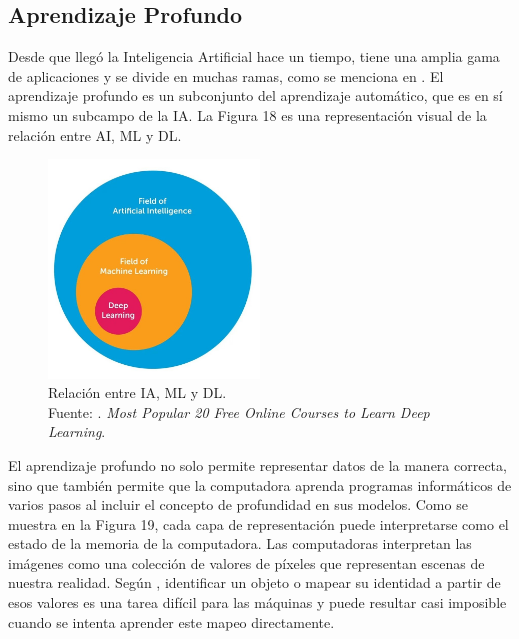\subsection{Aprendizaje Profundo}

Desde que llegó la Inteligencia Artificial hace un tiempo, tiene una amplia gama de aplicaciones y se divide en muchas ramas, como se menciona en \parencite{gl_sas_deeplearning}. El aprendizaje profundo es un subconjunto del aprendizaje automático, que es en sí mismo un subcampo de la IA. La Figura 18 es una representación visual de la relación entre AI, ML y DL.

\begin{figure}[!ht]
	\begin{center}
		\includegraphics[width=0.50\textwidth]{2/figures/deeplearning_machinelearning.jpg}
		\caption[Relación entre IA, ML y DL]{Relación entre IA, ML y DL.\\
		Fuente: \cite{tec_cook2018deeplearning}. \textit{Most Popular 20 Free Online Courses to Learn Deep Learning}.}
		\label{2:fig5}
	\end{center}
\end{figure}

El aprendizaje profundo no solo permite representar datos de la manera correcta, sino que también permite que la computadora aprenda programas informáticos de varios pasos al incluir el concepto de profundidad en sus modelos. Como se muestra en la Figura 19, cada capa de representación puede interpretarse como el estado de la memoria de la computadora. Las computadoras interpretan las imágenes como una colección de valores de píxeles que representan escenas de nuestra realidad. Según \parencite{tec_cook2018deeplearning}, identificar un objeto o mapear su identidad a partir de esos valores es una tarea difícil para las máquinas y puede resultar casi imposible cuando se intenta aprender este mapeo directamente.

